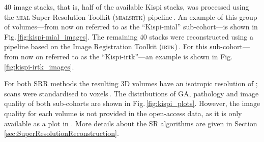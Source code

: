 \num{40} image stacks, that is, half of the available Kispi stacks, was processed using the \textsc{mial} Super-Resolution Toolkit (\textsc{mialsrtk}) pipeline\,\cite{Tourbier2015, MIALSRTK}. An example of this group of volumes---from now on referred to as the \enquote{Kispi-mial} sub-cohort---is shown in Fig.\,\ref{fig:kispi-mial_images}. The remaining \num{40} stacks were reconstructed using a pipeline based on the Image Registration Toolkit (\textsc{irtk})\,\cite{Kuklisova2012, irtk-simple}. For this sub-cohort---from now on referred to as the \enquote{Kispi-irtk}---an example is shown in Fig.\,\ref{fig:kispi-irtk_images}.

For both SRR methods the resulting 3D volumes have an isotropic resolution of ; scans were standardised to  voxels\,\cite{FeTA2021_review}. The distributions of GA, pathology and image quality of both sub-cohorts are shown in Fig.\,\ref{fig:kispi_plots}. However, the image quality for each volume is not provided in the open-access data, as it is only available as a plot in \cite{FeTA2024_review}. More details about the SR algorithms are given in Section \ref{sec:SuperResolutionReconstruction}.

